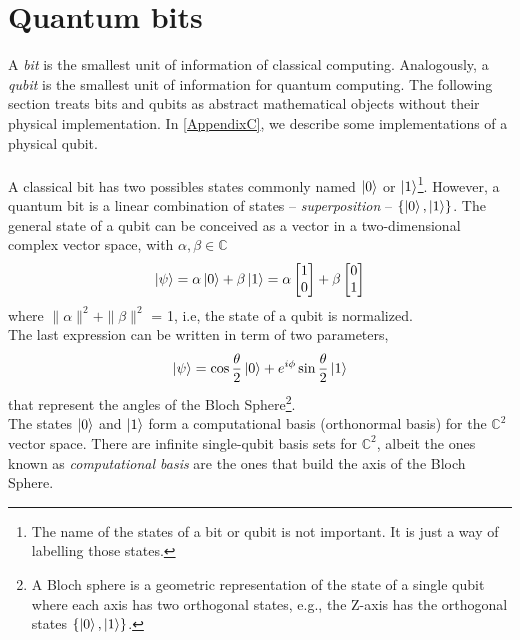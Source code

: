 \section{Quantum bits}
A \textit{bit} is the smallest unit of information of classical computing. Analogously, a \textit{qubit} is the smallest unit of information for quantum computing. The following section treats bits and qubits as abstract mathematical objects without their physical implementation. In \ref{AppendixC}, we describe some implementations of a physical qubit.\\\\
A classical bit has two possibles states commonly named $\ket{0}$ or $\ket{1}$\footnote{The name of the states of a bit or qubit is not important. It is just a way of labelling those states.}. However, a quantum bit is a linear combination of states -- \textit{superposition} -- $\{\ket{0}, \ket{1}\}$. The general state of a qubit can be conceived as a vector in a two-dimensional complex vector space, with $\alpha, \beta \in \mathbb{C}$
\begin{equation}
    \ket{\psi} = \alpha \ket{0} + \beta \ket{1} = \alpha \begin{bmatrix}
           1 \\
           0 
         \end{bmatrix}
         +
         \beta
         \begin{bmatrix}
           0 \\
           1 
         \end{bmatrix}
\end{equation}
where $\|\alpha\|^{2} + \|\beta\|^{2}$ = 1, i.e, the state of a qubit is normalized.\\
The last expression can be written in term of two parameters,
\begin{equation}
    \ket{\psi} = \cos{\frac{\theta}{2}}\ket{0} + e^{i\phi}\sin{\frac{\theta}{2}}\ket{1}
\end{equation}
that represent the angles of the Bloch Sphere\footnote{A Bloch sphere is a geometric representation of the state of a single qubit where each axis has two orthogonal states, e.g., the Z-axis has the orthogonal states $\{\ket{0},\ket{1}\}$.}.\\
The states $\ket{0}$ and $\ket{1}$ form a computational basis (orthonormal basis) for the $\mathbb{C}^{2}$ vector space. There are infinite single-qubit basis sets for $\mathbb{C}^{2}$, albeit the ones known as \textit{computational basis} are the ones that build the axis of the Bloch Sphere.


